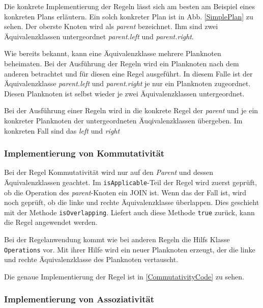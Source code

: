 Die konkrete Implementierung der Regeln lässt sich am besten am Beispiel eines konkreten Plans erläutern. Ein solch konkreter Plan ist in Abb. \ref{SimplePlan} zu sehen. Der oberste Knoten wird als \textit{parent} bezeichnet. Ihm sind zwei Äquivalenzklassen untergeordnet \textit{parent.left} und \textit{parent.right}. 

Wie bereits bekannt, kann eine Äquivalenzklasse mehrere Planknoten beheimaten. Bei der Ausführung der Regeln wird ein Planknoten nach dem anderen betrachtet und für diesen eine Regel ausgeführt. In diesem Falle ist der Äquivalenzklasse \textit{parent.left} und \textit{parent.right} je nur ein Planknoten zugeordnet. Diesen Planknoten ist selbst wieder je zwei Äquivalenzklassen untergeordnet.


Bei der Ausführung einer Regeln wird in die konkrete Regel der \textit{parent} und je ein konkreter Planknoten der untergeordneten Äuqivalenzklassen übergeben. Im konkreten Fall sind das \textit{left} und \textit{right}





\subsubsection{Implementierung von Kommutativität}

Bei der Regel Kommutativität wird nur auf den \textit{Parent} und dessen Äquivalenzklassen geachtet. Im \texttt{isApplicable}-Teil der Regel wird zuerst geprüft, ob die Operation des \textit{parent}-Knoten ein JOIN ist. Wenn das der Fall ist, wird noch geprüft, ob die linke und rechte Äquivalenzklasse überlappen. Dies geschieht mit der Methode \texttt{isOverlapping}. Liefert auch diese Methode \texttt{true} zurück, kann die Regel angewendet werden.

Bei der Regelanwendung kommt wie bei anderen Regeln die Hilfs Klasse \texttt{Operations} vor. Mit ihrer Hilfe wird ein neuer Planknoten erzeugt, der die linke und rechte Äquivalenzklasse des Planknoten vertauscht.

Die genaue Implementierung der Regel ist in \ref{CommutativityCode} zu sehen.





\subsubsection{Implementierung von Assoziativität}

